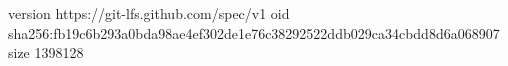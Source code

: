 version https://git-lfs.github.com/spec/v1
oid sha256:fb19c6b293a0bda98ae4ef302de1e76c38292522ddb029ca34cbdd8d6a068907
size 1398128
